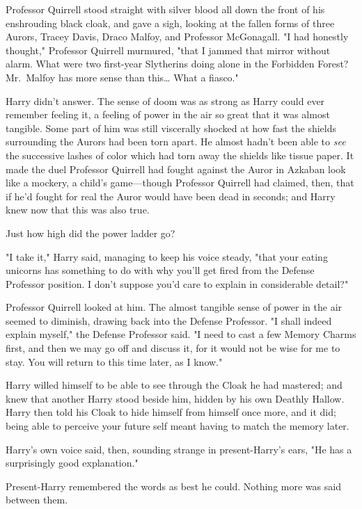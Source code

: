 Professor Quirrell stood straight with silver blood all down the front of his 
enshrouding black cloak, and gave a sigh, looking at the fallen forms of three 
Aurors, Tracey Davis, Draco Malfoy, and Professor McGonagall. "I had honestly 
thought," Professor Quirrell murmured, "that I jammed that mirror without 
alarm. What were two first-year Slytherins doing alone in the Forbidden Forest? 
Mr.~Malfoy has more sense than this{\ldots} What a fiasco."

Harry didn't answer. The sense of doom was as strong as Harry could ever 
remember feeling it, a feeling of power in the air so great that it was almost 
tangible. Some part of him was still viscerally shocked at how fast the shields 
surrounding the Aurors had been torn apart. He almost hadn't been able to 
\emph{see} the successive lashes of color which had torn away the shields like 
tissue paper. It made the duel Professor Quirrell had fought against the Auror 
in Azkaban look like a mockery, a child's game---though Professor Quirrell had 
claimed, then, that if he'd fought for real the Auror would have been dead in 
seconds; and Harry knew now that this was also true.

Just how high did the power ladder go?

"I take it," Harry said, managing to keep his voice steady, "that your eating 
unicorns has something to do with why you'll get fired from the Defense 
Professor position. I don't suppose you'd care to explain in considerable 
detail?"

Professor Quirrell looked at him. The almost tangible sense of power in the air 
seemed to diminish, drawing back into the Defense Professor. "I shall indeed 
explain myself," the Defense Professor said. "I need to cast a few Memory 
Charms first, and then we may go off and discuss it, for it would not be wise 
for me to stay. You will return to this time later, as I know."

Harry willed himself to be able to see through the Cloak he had mastered; and 
knew that another Harry stood beside him, hidden by his own Deathly Hallow. 
Harry then told his Cloak to hide himself from himself once more, and it did; 
being able to perceive your future self meant having to match the memory later.

Harry's own voice said, then, sounding strange in present-Harry's ears, "He has 
a surprisingly good explanation."

Present-Harry remembered the words as best he could. Nothing more was said 
between them.

